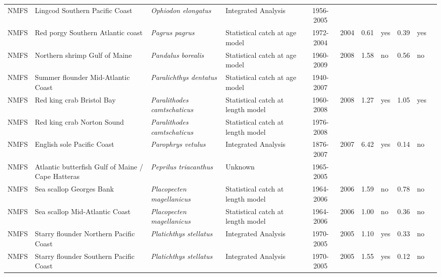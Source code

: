 \begin{longtable}{p{1.8cm}p{3.5cm}p{3.5cm}p{3cm}cccp{0.9cm}cp{0.9cm}c}
  NMFS & Lingcod Southern Pacific Coast & \textit{Ophiodon elongatus} & Integrated Analysis & 1956-2005 &  &  &  &  &  & \cite{2005_SAFE_Wclingcod.pdf} \\ 
  NMFS & Red porgy Southern Atlantic coast & \textit{Pagrus pagrus} & Statistical catch at age model & 1972-2004 & 2004 & 0.61 & yes & 0.39 & yes & \cite{JENSEN_RPORGYSATLC_2006.pdf} \\ 
  NMFS & Northern shrimp Gulf of Maine & \textit{Pandalus borealis} & Statistical catch at age model & 1960-2009 & 2008 & 1.58 & no & 0.56 & no & \cite{2008ShrimpAssessment.pdf} \\ 
  NMFS & Summer flounder Mid-Atlantic Coast & \textit{Paralichthys dentatus} & Statistical catch at age model & 1940-2007 &  &  &  &  &  & \cite{NMFS-MATLC-Paralichthysdentatus-2008.pdf} \\ 
  NMFS & Red king crab Bristol Bay & \textit{Paralithodes camtschaticus} & Statistical catch at length model & 1960-2008 & 2008 & 1.27 & yes & 1.05 & yes & \cite{CRABSAFE2008.pdf} \\ 
  NMFS & Red king crab Norton Sound & \textit{Paralithodes camtschaticus} & Statistical catch at length model & 1976-2008 &  &  &  &  &  & \cite{CRABSAFE2008.pdf} \\ 
  NMFS & English sole Pacific Coast & \textit{Parophrys vetulus} & Integrated Analysis & 1876-2007 & 2007 & 6.42 & yes & 0.14 & no & \cite{NWFSC-ESOLEPCOAST-2007-EnglishSole.pdf} \\ 
  NMFS & Atlantic butterfish Gulf of Maine / Cape Hatteras & \textit{Peprilus triacanthus} & Unknown & 1965-2005 &  &  &  &  &  & \cite{butterfish-assessment-2004.pdf} \\ 
  NMFS & Sea scallop Georges Bank & \textit{Placopecten magellanicus} & Statistical catch at length model & 1964-2006 & 2006 & 1.59 & no & 0.78 & no & \cite{SeaScallop2007.pdf} \\ 
  NMFS & Sea scallop Mid-Atlantic Coast & \textit{Placopecten magellanicus} & Statistical catch at length model & 1964-2006 & 2006 & 1.00 & no & 0.36 & no & \cite{SeaScallop2007.pdf} \\ 
  NMFS & Starry flounder Northern Pacific Coast & \textit{Platichthys stellatus} & Integrated Analysis & 1970-2005 & 2005 & 1.10 & yes & 0.33 & no & \cite{2005-SAFE-WCstarryflounder.pdf} \\ 
  NMFS & Starry flounder Southern Pacific Coast & \textit{Platichthys stellatus} & Integrated Analysis & 1970-2005 & 2005 & 1.55 & yes & 0.12 & no & \cite{2005-SAFE-WCstarryflounder.pdf} \\ 

\end{longtable}
